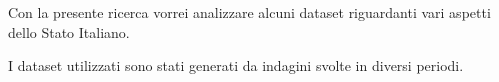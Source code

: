 Con la presente ricerca vorrei analizzare alcuni dataset riguardanti vari aspetti dello Stato Italiano.

I dataset utilizzati sono stati generati da indagini svolte in diversi periodi.


